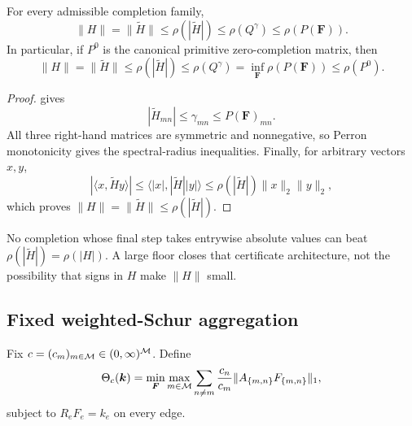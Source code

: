 \begin{theorem}
\label{thm:Perron-floor}
For every admissible completion family,
\begin{equation}
 \boxed{
 \|H\|=\|\widetilde H\|
 \le
 \rho(|\widetilde H|)
 \le
 \rho(Q^\gamma)
 \le
 \rho(P(\boldsymbol F)).}
 \label{eq:Perron-floor}
\end{equation}
In particular, if \(P^0\) is the canonical primitive zero-completion
matrix, then
\begin{equation}
 \|H\|=\|\widetilde H\|
 \le\rho(|\widetilde H|)
 \le\rho(Q^\gamma)
 =
 \inf_{\boldsymbol F}\rho(P(\boldsymbol F))
 \le\rho(P^0).
 \label{eq:Perron-sandwich}
\end{equation}
\end{theorem}

\begin{proof}
 gives
\[
 |\widetilde H_{mn}|\le\gamma_{mn}\le P(\boldsymbol F)_{mn}.
\]
All three right-hand matrices are symmetric and nonnegative, so Perron
monotonicity gives the spectral-radius inequalities.  Finally, for
arbitrary vectors \(x,y\),
\[
 |\langle x,\widetilde Hy\rangle|
 \le \langle |x|,|\widetilde H||y|\rangle
 \le \rho(|\widetilde H|)\|x\|_2\|y\|_2,
\]
which proves
\(\|H\|=\|\widetilde H\|\le\rho(|\widetilde H|)\).
\end{proof}

\begin{remark}
No completion whose final step takes entrywise absolute values can beat
\(\rho(|\widetilde H|)=\rho(|H|)\).  A large floor closes that
certificate architecture, not the possibility that signs in \(H\) make
\(\|H\|\) small.
\end{remark}

\subsection{Fixed weighted-Schur aggregation}

Fix \(c=(c_m)_{m\in\mathcal M}\in(0,\infty)^{\mathcal M}\).  Define
\begin{equation}
 \Theta_c(\boldsymbol k)
 =
 \min_{\boldsymbol F}
 \max_{m\in\mathcal M}
 \sum_{n\ne m}\frac{c_n}{c_m}
 \|A_{\{m,n\}}F_{\{m,n\}}\|_1,
 \label{eq:fixed-c-primal}
\end{equation}
subject to \(R_eF_e=k_e\) on every edge.

